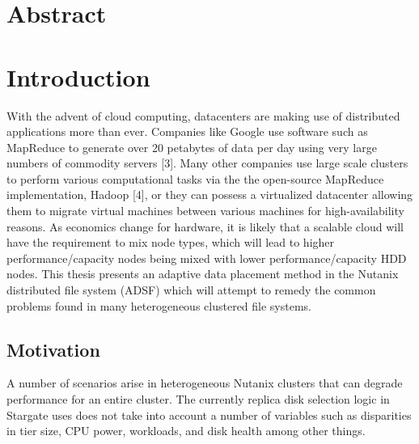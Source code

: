 \documentclass[12pt]{article}
\begin{document}
\author{Cyril Allen\\
Harvard Extension School}
\renewcommand{\today}{who knows}


\tableofcontents
\listoffigures

\section{Abstract}


\section{Introduction}

With the advent of cloud computing, datacenters are making use of distributed
applications more than ever. Companies like Google use software such as
MapReduce to generate over 20 petabytes of data per day using very large
numbers of commodity servers [3]. Many other companies use large scale clusters
to perform various computational tasks via the the open-source MapReduce
implementation, Hadoop [4], or they can possess a virtualized datacenter
allowing them to migrate virtual machines between various machines for
high-availability reasons. As economics change for hardware, it is likely that
a scalable cloud will have the requirement to mix node types, which will lead
to higher performance/capacity nodes being mixed with lower
performance/capacity HDD nodes. This thesis presents an adaptive data placement
method in the Nutanix distributed file system (ADSF) which will attempt to
remedy the common problems found in many heterogeneous clustered file systems.

  \subsection{Motivation}

  A number of scenarios arise in heterogeneous Nutanix clusters that can
  degrade performance for an entire cluster. The currently replica disk
  selection logic in Stargate uses does not take into account a number of
  variables such as disparities in tier size, CPU power, workloads, and disk
  health among other things.
\end{document}

